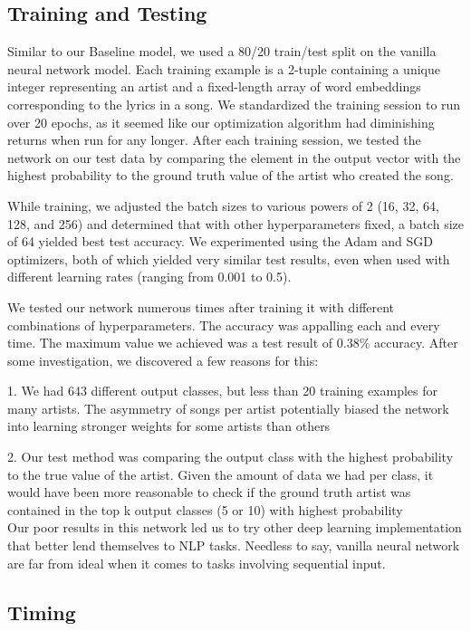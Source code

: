\documentclass[11pt,a4paper]{article}
\begin{document}
\subsection{Training and Testing} 

Similar to our Baseline model, we used a 80/20 train/test split on the vanilla neural network model. Each training example is a 2-tuple containing a unique integer representing an artist and a fixed-length array of word embeddings corresponding to the lyrics in a song. We standardized the training session to run over 20 epochs, as it seemed like our optimization algorithm had diminishing returns when run for any longer. After each training session, we tested the network on our test data by comparing the element in the output vector with the highest probability to the ground truth value of the artist who created the song.

While training, we adjusted the batch sizes to various powers of 2 (16, 32, 64, 128, and 256) and determined that with other hyperparameters fixed, a batch size of 64 yielded best test accuracy. We experimented using the Adam and SGD optimizers, both of which yielded very similar test results, even when used with different learning rates (ranging from 0.001 to 0.5). 

We tested our network numerous times after training it with different combinations of hyperparameters. The accuracy was appalling each and every time. The maximum value we achieved was a test result of 0.38\% accuracy. After some investigation, we discovered a few reasons for this:

1. We had 643 different output classes, but less than 20 training examples for many artists. The asymmetry of songs per artist potentially biased the network into learning stronger weights for some artists than others

2. Our test method was comparing the output class with the highest probability to the true value of the artist. Given the amount of data we had per class, it would have been more reasonable to check if the ground truth artist was contained in the top k output classes (5 or 10) with highest probability
\\ 

Our poor results in this network led us to try other deep learning implementation that better lend themselves to NLP tasks. Needless to say, vanilla neural network are far from ideal when it comes to tasks involving sequential input.

\subsection{Timing}   
\end{document}
